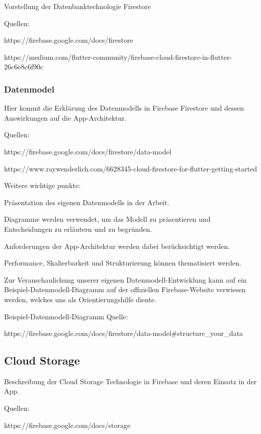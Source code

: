 Vorstellung der Datenbanktechnologie Firestore

Quellen:

https://firebase.google.com/docs/firestore

https://medium.com/flutter-community/firebase-cloud-firestore-in-flutter-26c6e8c6f90c

\subsubsection{Datenmodel}

Hier kommt die Erklärung des Datenmodells in Firebase Firestore und dessen Auswirkungen auf die App-Architektur.

Quellen:

https://firebase.google.com/docs/firestore/data-model

https://www.raywenderlich.com/6628345-cloud-firestore-for-flutter-getting-started

Weitere wichtige punkte:

\begin{compactitem}
    \item Präsentation des eigenen Datenmodells in der Arbeit.
    \item Diagramme werden verwendet, um das Modell zu präsentieren und Entscheidungen zu erläutern und zu begründen.
    \item Anforderungen der App-Architektur werden dabei berücksichtigt werden.
    \item Performance, Skalierbarkeit und Strukturierung können thematisiert werden.
    \item Zur Veranschaulichung unserer eigenen Datenmodell-Entwicklung kann auf ein Beispiel-Datenmodell-Diagramm auf der offiziellen Firebase-Website verwiesen werden, welches uns als Orientierungshilfe diente.
\end{compactitem}

Beispiel-Datenmodell-Diagramm Quelle:

https://firebase.google.com/docs/firestore/data-model\#structure\_your\_data

\subsection{Cloud Storage}

Beschreibung der Cloud Storage Technologie in Firebase und deren Einsatz in der App.

Quellen:

https://firebase.google.com/docs/storage

